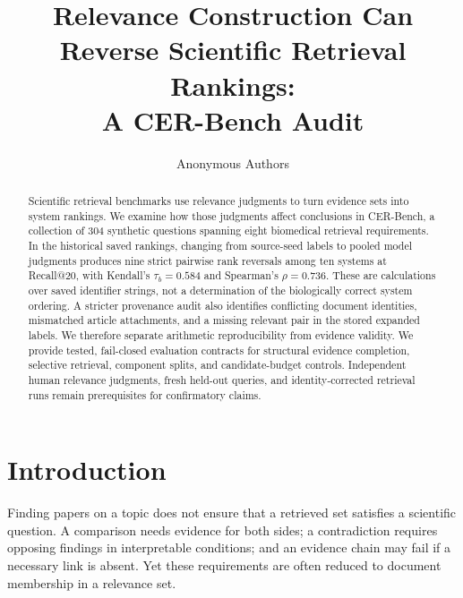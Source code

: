 \documentclass{article}
\title{Relevance Construction Can Reverse Scientific Retrieval Rankings:\\A CER-Bench Audit}
\author{Anonymous Authors}
\begin{document}
\maketitle

\begin{center}
\end{center}

\begin{abstract}
Scientific retrieval benchmarks use relevance judgments to turn evidence sets into
system rankings. We examine how those judgments affect conclusions in CER-Bench,
a collection of 304 synthetic questions spanning eight biomedical retrieval
requirements. In the historical saved rankings, changing from source-seed labels
to pooled model judgments produces nine strict pairwise rank reversals among ten
systems at Recall@20, with Kendall's $\tau_b=0.584$ and Spearman's $\rho=0.736$.
These are calculations over saved identifier strings, not a determination of the
biologically correct system ordering. A stricter provenance audit also identifies
conflicting document identities, mismatched article attachments, and a missing
relevant pair in the stored expanded labels. We therefore separate arithmetic
reproducibility from evidence validity. We provide tested, fail-closed evaluation
contracts for structural evidence completion, selective retrieval, component
splits, and candidate-budget controls. Independent human relevance judgments,
fresh held-out queries, and identity-corrected retrieval runs remain prerequisites
for confirmatory claims.
\end{abstract}

\section{Introduction}
Finding papers on a topic does not ensure that a retrieved set satisfies a
scientific question. A comparison needs evidence for both sides; a contradiction
requires opposing findings in interpretable conditions; and an evidence chain may
fail if a necessary link is absent. Yet these requirements are often reduced to
document membership in a relevance set.
\end{document}
